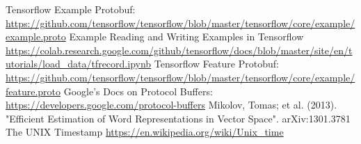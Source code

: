 \documentclass[paper=a4, fontsize=11pt]{scrartcl} %
\begin{document}
\begin{thebibliography}{2}
 Tensorflow Example Protobuf: \url{https://github.com/tensorflow/tensorflow/blob/master/tensorflow/core/example/example.proto}
 Example Reading and Writing Examples in Tensorflow \url{https://colab.research.google.com/github/tensorflow/docs/blob/master/site/en/tutorials/load_data/tfrecord.ipynb} 
 Tensorflow Feature Protobuf:
\url{https://github.com/tensorflow/tensorflow/blob/master/tensorflow/core/example/feature.proto}
 Google's Docs on Protocol Buffers:
\url{https://developers.google.com/protocol-buffers}
 Mikolov, Tomas; et al. (2013). "Efficient Estimation of Word Representations in Vector Space". arXiv:1301.3781
 The UNIX Timestamp \url{https://en.wikipedia.org/wiki/Unix_time}
\end{thebibliography}
\end{document}
